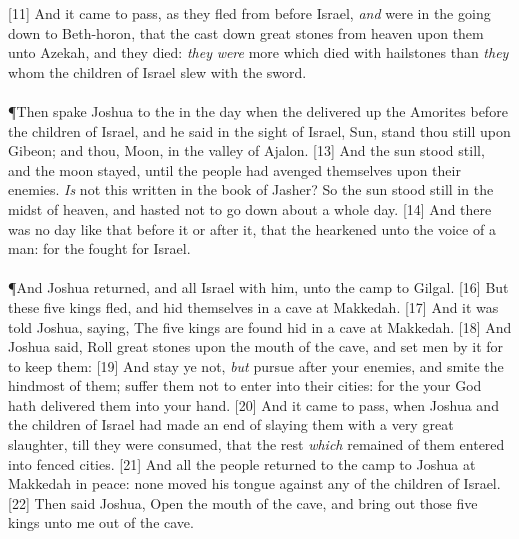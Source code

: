 [11] \textcolor[cmyk]{0.99998,1,0,0}{And it came to pass, as they fled from before Israel, \emph{and} were in the going down to Beth-horon, that the  cast down great stones from heaven upon them unto Azekah, and they died: \emph{they} \emph{were} more which died with hailstones than \emph{they} whom the children of Israel slew with the sword.}\\
\\
\P \textcolor[cmyk]{0.99998,1,0,0}{Then spake Joshua to the  in the day when the  delivered up the Amorites before the children of Israel, and he said in the sight of Israel, Sun, stand thou still upon Gibeon; and thou, Moon, in the valley of Ajalon.}
[13] \textcolor[cmyk]{0.99998,1,0,0}{And the sun stood still, and the moon stayed, until the people had avenged themselves upon their enemies. \emph{Is} not this written in the book of Jasher? So the sun stood still in the midst of heaven, and hasted not to go down about a whole day.}
[14] \textcolor[cmyk]{0.99998,1,0,0}{And there was no day like that before it or after it, that the  hearkened unto the voice of a man: for the  fought for Israel.}\\
\\
\P \textcolor[cmyk]{0.99998,1,0,0}{And Joshua returned, and all Israel with him, unto the camp to Gilgal.}
[16] \textcolor[cmyk]{0.99998,1,0,0}{But these five kings fled, and hid themselves in a cave at Makkedah.}
[17] \textcolor[cmyk]{0.99998,1,0,0}{And it was told Joshua, saying, The five kings are found hid in a cave at Makkedah.}
[18] \textcolor[cmyk]{0.99998,1,0,0}{And Joshua said, Roll great stones upon the mouth of the cave, and set men by it for to keep them:}
[19] \textcolor[cmyk]{0.99998,1,0,0}{And stay ye not, \emph{but} pursue after your enemies, and smite the hindmost of them; suffer them not to enter into their cities: for the  your God hath delivered them into your hand.}
[20] \textcolor[cmyk]{0.99998,1,0,0}{And it came to pass, when Joshua and the children of Israel had made an end of slaying them with a very great slaughter, till they were consumed, that the rest \emph{which} remained of them entered into fenced cities.}
[21] \textcolor[cmyk]{0.99998,1,0,0}{And all the people returned to the camp to Joshua at Makkedah in peace: none moved his tongue against any of the children of Israel.}
[22] \textcolor[cmyk]{0.99998,1,0,0}{Then said Joshua, Open the mouth of the cave, and bring out those five kings unto me out of the cave.}
